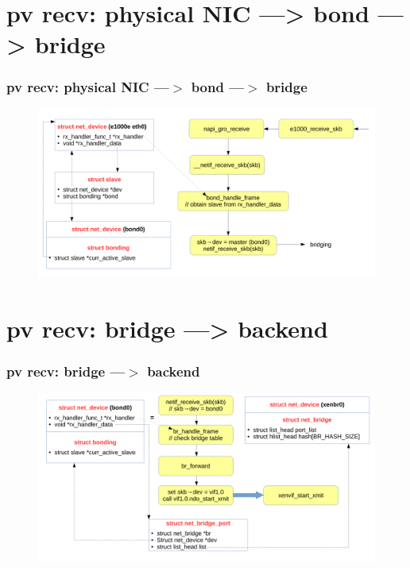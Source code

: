 \documentclass[aspectratio=169]{beamer}
\begin{document}

\section{pv recv: physical NIC ---> bond ---> bridge}
\begin{frame}
\frametitle{pv recv: physical NIC ---$>$ bond ---$>$ bridge}
\begin{figure}
\includegraphics[width=1.0\linewidth]{figures/bond_to_bridge.pdf}
\end{figure}
\end{frame}


\section{pv recv: bridge ---> backend}
\begin{frame}
\frametitle{pv recv: bridge ---$>$ backend}
\begin{figure}
\includegraphics[width=1.0\linewidth]{figures/bridge_to_vif.pdf}
\end{figure}
\end{frame}
\end{document}
